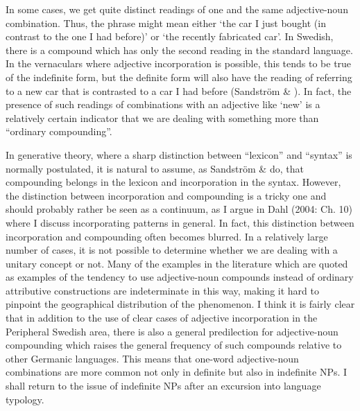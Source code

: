 In some cases, we get quite distinct readings of one and the same adjective-noun combination. Thus, the phrase  might mean either ‘the car I just bought (in contrast to the one I had before)’ or ‘the recently fabricated car’. In Swedish, there is a compound  which has only the second reading in the standard language. In the vernaculars where adjective incorporation is possible, this tends to be true of the indefinite form, but the definite form will also have the reading of referring to a new car that is contrasted to a car I had before (Sandström \& \citet[91]{Holmberg2003}). In fact, the presence of such readings of combinations with an adjective like ‘new’ is a relatively certain indicator that we are dealing with something more than “ordinary compounding”.


In generative theory, where a sharp distinction between “lexicon” and “syntax” is normally postulated, it is natural to assume, as Sandström \& \citet{Holmberg2003} do, that compounding belongs in the lexicon and incorporation in the syntax. However, the distinction between incorporation and compounding is a tricky one and should probably rather be seen as a continuum, as I argue in Dahl (2004: Ch. 10) where I discuss incorporating patterns in general. In fact, this distinction between incorporation and compounding often becomes blurred. In a relatively large number of cases, it is not possible to determine whether we are dealing with a unitary concept or not. Many of the examples in the literature which are quoted as examples of the tendency to use adjective-noun compounds instead of ordinary attributive constructions are indeterminate in this way, making it hard to pinpoint the geographical distribution of the phenomenon. I think it is fairly clear that in addition to the use of clear cases of adjective incorporation in the Peripheral Swedish area, there is also a general predilection for adjective-noun compounding which raises the general frequency of such compounds relative to other Germanic languages. This means that one-word adjective-noun combinations are more common not only in definite but also in indefinite NPs. I shall return to the issue of indefinite NPs after an excursion into language typology.

